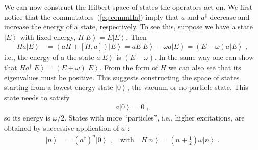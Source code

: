 \documentclass[12pt]{report}
\newcommand{\ket}[1]{\ensuremath{\!\left| #1 \right\rangle}}
\newcommand{\2}{\ensuremath{\sqrt{2}\,}}
\begin{document}
      We can now construct the Hilbert space  
      of states the operators act on. We first notice that the
      commutators~(\ref{eq:commHa}) imply that $a$ and $a^\dagger$ decrease and increase the energy of
      a state, respectively. To see this, suppose we have a state $\ket{E}$ with fixed energy, 
      $H\ket{E}=E\ket{E}$. Then 
      \begin{align}
        H a \ket{E}&= \left(a H +\left[H,a\right]\right) \ket{E} = a E \ket{E} - \omega a\ket{E} =
        \left(E-\omega\right) a \ket{E} \;,
      \end{align}
      i.e., the energy of a the state $a\ket{E}$ is $(E-\omega)$. In the same way one can show that
      \mbox{$H a^\dagger \ket{E}=(E+\omega)\ket{E}$}.  From the form of $H$ we can also see that its
      eigenvalues must be positive. This suggests constructing the space of states starting from a
      lowest-energy state $\ket{0}$, the vacuum or no-particle state. This state needs
      to satisfy  
      \begin{align}  
      a\ket{0}=0\;,
      \end{align} 
      so its energy is $\omega/2$. States with more ``particles'', i.e., higher excitations, are
      obtained by successive application of $a^\dagger$: 
      \begin{align}
        \ket{n}&=\left(a^\dagger\right)^n \ket{0}\;, \quad \text{with} \quad
        H\ket{n}=\left(n+\frac{1}{2}\right)\omega \ket{n}\;.
      \end{align}
 
\end{document}
